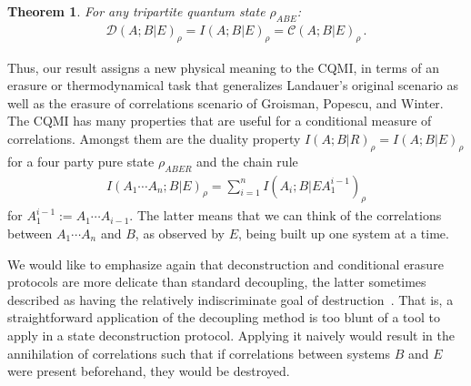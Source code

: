 \documentclass[a4paper,aps,prl,twocolumn,10pt,superscriptaddress]{revtex4-1}
\theoremstyle{plain}
\newtheorem{theorem}[lemma]{Theorem}
\theoremstyle{definition}
\begin{document}
\begin{theorem}\label{thm:CQMI-upper-decons}
For any tripartite quantum state $\rho_{ABE}$:
\begin{align*}
\mathcal{D}(A;B|E)_\rho=I(A;B|E)_\rho=\mathcal{C}(A;B|E)_\rho\,.
\end{align*}
\end{theorem}

Thus, our result assigns a new physical meaning to the CQMI, in terms of an erasure or thermodynamical task that generalizes Landauer's original scenario as well as the erasure of correlations scenario of Groisman, Popescu, and Winter. The CQMI has many properties that are useful for a conditional measure of correlations. Amongst them are the duality property $I(A;B|R)_{\rho}=I(A;B|E)_{\rho}$ for a four party pure state $\rho_{ABER}$ and the chain rule
\begin{align}
I(A_{1}\cdots A_{n};B|E)_\rho=\sum_{i=1}^{n}I(A_{i};B|EA_{1}^{i-1})_\rho\label{eq:chainrule}
\end{align}
for $A_{1}^{i-1}:=A_{1}\cdots A_{i-1}$. The latter means that we can think of the correlations between $A_{1}\cdots A_{n}$ and $B$, as observed by $E$, being built up one system at a time.

We would like to emphasize again that deconstruction and conditional erasure protocols are more delicate than standard decoupling, the latter sometimes described as having the relatively indiscriminate goal of destruction~\cite{ADHW06FQSW}. That is, a straightforward application of the decoupling method is too blunt of a tool to apply in a state deconstruction protocol. Applying it naively would result in the annihilation of correlations such that if correlations between systems $B$ and $E$ were present beforehand, they would be destroyed.

\end{document}
